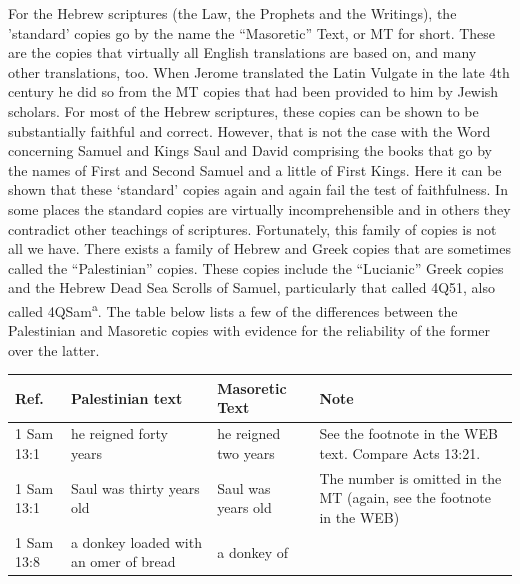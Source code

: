 {For the Hebrew scriptures (the Law, the Prophets and the Writings),
the 'standard' copies go by the name the ``Masoretic'' Text, or MT for
short. These are the copies that virtually all English translations
are based on, and many other translations, too. When Jerome translated
the Latin Vulgate in the late 4th century he did so from the MT copies that had been provided to him by Jewish scholars. For most of the Hebrew scriptures, these copies can be shown to be substantially faithful and correct. However, that is not the case with the Word concerning
Samuel and Kings Saul and David comprising the books that go by the names of First and Second Samuel and a little of First Kings. Here it can be shown that these
`standard' copies again and again fail the test of faithfulness. In some places the standard copies are virtually incomprehensible and in others they contradict other teachings of scriptures.
Fortunately, this family of copies is not all we have. There exists a
family of Hebrew and Greek copies that are sometimes called the
``Palestinian'' copies. These copies include the ``Lucianic'' Greek copies and the
Hebrew Dead Sea Scrolls of Samuel, particularly that called 4Q51, also
called 4QSam\textsuperscript{a}. The table below lists a few of the
differences between the Palestinian and Masoretic copies with evidence
for the reliability of the former over the latter.
\begin{tabular}{p{}p{}p{}p{}}\hline
  Ref.& Palestinian text& Masoretic Text&Note\\\hline
  1 Sam 13:1&he reigned forty years&he reigned two years&See the
                                                          footnote in
                                                          the WEB
                                                          text. Compare
                                                          Acts
                                                          13:21.\\
  1 Sam 13:1&Saul was thirty years old&Saul was years old&The number
                                                           is omitted
                                                           in the MT
                                                           (again, see
                                                           the
                                                           footnote in
                                                           the WEB)\\
  1 Sam 13:8&a donkey loaded with an omer of bread&a donkey of

\end{tabular}}
